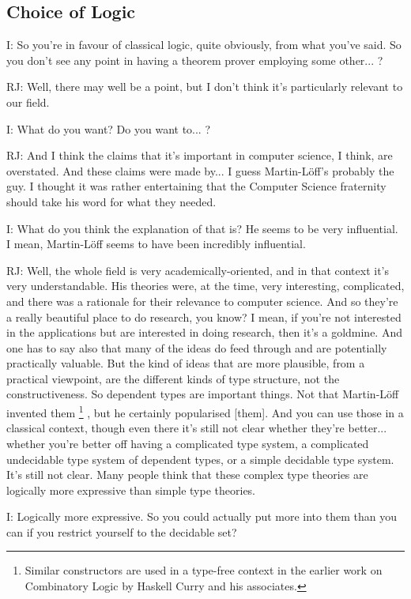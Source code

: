 \documentclass[10pt,titlepage]{book}
\def\ouml{\"o}
\begin{document}
\subsection{Choice of Logic}

I: So you're in favour of classical logic, quite obviously, from what you've said.
So you don't see any point in having a theorem prover employing some other... ?

RJ: Well, there may well be a point, but I don't think it's particularly relevant to our field.

I: What do you want?
Do you want to... ?

RJ: And I think the claims that it's important in computer science, I think, are overstated.
And these claims were made by... I guess Martin-L\"off's\index{Martin-L{\ouml}ff} probably the guy.
I thought it was rather entertaining that the Computer Science fraternity should take his word for what they needed.

I: What do you think the explanation of that is?
He seems to be very influential.
I mean, Martin-L\"off seems to have been incredibly influential.

RJ: Well, the whole field is very academically-oriented, and in that context it's very understandable.
His theories were, at the time, very interesting, complicated, and there was a rationale for their relevance to computer science.
And so they're a really beautiful place to do research, you know?
I mean, if you're not interested in the applications but are interested in doing research, then it's a goldmine.
And one has to say also that many of the ideas do feed through and are potentially practically valuable.
But the kind of ideas that are more plausible, from a practical viewpoint, are the different kinds of type structure, not the constructiveness.
So dependent types are important things.
Not that Martin-L\"off invented them%
\footnote{
Similar constructors are used in a type-free context in the earlier work on Combinatory Logic by Haskell Curry and his associates.
}%
, but he certainly popularised [them].
And you can use those in a classical context, though even there it's still not clear whether they're better... whether you're better off having a complicated type system, a complicated undecidable type system of dependent types, or a simple decidable type system.
It's still not clear.
Many people think that these complex type theories are logically more expressive than simple type theories.

I: Logically more expressive.
So you could actually put more into them than you can if you restrict yourself to the decidable set?
\end{document}
